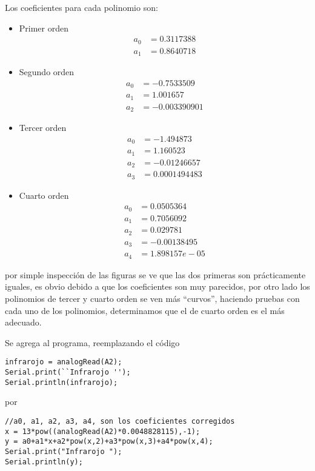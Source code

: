 \documentclass[letterpaper]{article}
\begin{document}
Los coeficientes para cada polinomio son:
\begin{itemize}
  \item Primer orden
    \begin{eqnarray*}
      a_0 &= 0.3117388\\
      a_1 &= 0.8640718
    \end{eqnarray*}
  \item Segundo orden
    \begin{eqnarray*}
      a_0 &= -0.7533509\\
      a_1 &= 1.001657\\
      a_2 &= -0.003390901
    \end{eqnarray*}
  \item Tercer orden
    \begin{eqnarray*}
      a_0 &= -1.494873\\
      a_1 &= 1.160523\\
      a_2 &= -0.01246657\\
      a_3 &= 0.0001494483 
    \end{eqnarray*}
  \item Cuarto orden
    \begin{eqnarray*}
      a_0 &= 0.0505364\\
      a_1 &= 0.7056092\\
      a_2 &= 0.029781\\
      a_3 &= -0.00138495\\
      a_4 &= 1.898157e-05
    \end{eqnarray*}
\end{itemize}
por simple inspección de las figuras se ve que las dos primeras son 
prácticamente iguales, es obvio debido a que los coeficientes son muy 
parecidos, por otro lado los polinomios de tercer y cuarto orden se ven 
más ``curvos'', haciendo pruebas con cada uno de los polinomios,
determinamos que el de cuarto orden es el más adecuado. 

Se agrega al programa, reemplazando el código
\begin{lstlisting}
infrarojo = analogRead(A2);
Serial.print(``Infrarojo '');
Serial.println(infrarojo);
\end{lstlisting}
por

\begin{lstlisting}
//a0, a1, a2, a3, a4, son los coeficientes corregidos
x = 13*pow((analogRead(A2)*0.0048828115),-1);
y = a0+a1*x+a2*pow(x,2)+a3*pow(x,3)+a4*pow(x,4);
Serial.print("Infrarojo ");
Serial.println(y);
\end{lstlisting}
\end{document}
